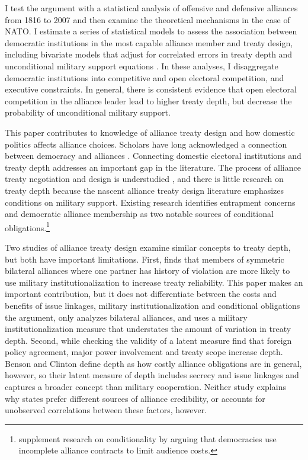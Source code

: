 \documentclass[12pt]{article}
\begin{document}
I test the argument with a statistical analysis of offensive and defensive alliances from 1816 to 2007 and then examine the theoretical mechanisms in the case of NATO.
I estimate a series of statistical models to assess the association between democratic institutions in the most capable alliance member and treaty design, including bivariate models that adjust for correlated errors in treaty depth and unconditional military support equations \citep{Braumoelleretal2018}. 
In these analyses, I disaggregate democratic institutions into competitive and open electoral competition, and executive constraints.
In general, there is consistent evidence that open electoral competition in the alliance leader lead to higher treaty depth, but decrease the probability of unconditional military support. 


This paper contributes to knowledge of alliance treaty design and how domestic politics affects alliance choices.
Scholars have long acknowledged a connection between democracy and alliances \citep{LaiReiter2000, GiblerWolford2006, Mattes2012, Warren2016, McManusYarhi-Milo2017}. 
Connecting domestic electoral institutions and treaty depth addresses an important gap in the literature. 
The process of alliance treaty negotiation and design is understudied \citep{Poast2019a}, and there is little research on treaty depth because the nascent alliance treaty design literature emphasizes conditions on military support.
Existing research identifies entrapment concerns \citep{Kim2011, Benson2012} and democratic alliance membership \citep{Mattes2012, Chibaetal2015} as two notable sources of conditional obligations.\footnote{\citet{FjelstulReiter2019} supplement research on conditionality by arguing that democracies use incomplete alliance contracts to limit audience costs.} 


Two studies of alliance treaty design examine similar concepts to treaty depth, but both have important limitations.   
First, \citet{Mattes2012} finds that members of symmetric bilateral alliances where one partner has history of violation are more likely to use military institutionalization to increase treaty reliability. 
This paper makes an important contribution, but it does not differentiate between the costs and benefits of issue linkages, military institutionalization and conditional obligations the argument, only analyzes bilateral alliances, and uses a military institutionalization measure \citep{LeedsAnac2005} that understates the amount of variation in treaty depth.  
Second, while checking the validity of a latent measure \citet{BensonClinton2016} find that foreign policy agreement, major power involvement and treaty scope increase depth. 
Benson and Clinton define depth as how costly alliance obligations are in general, however, so their latent measure of depth includes secrecy and issue linkages and captures a broader concept than military cooperation. 
Neither study explains why states prefer different sources of alliance credibility, or accounts for unobserved correlations between these factors, however. 
\end{document}
